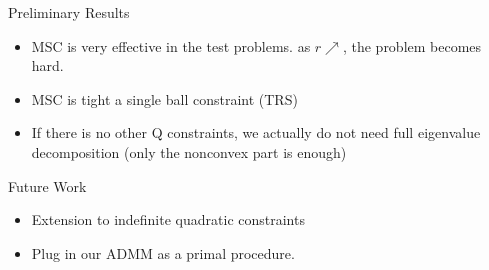 \documentclass[aspectratio=1610, 10pt]{beamer}
\begin{document}
\begin{frame}[allowframebreaks]{Preliminary Results}
  \begin{itemize}
    \item MSC is very effective in the test problems. as \(r \nearrow \), the problem becomes hard.
    \item MSC is tight a single ball constraint (TRS)
    \item If there is no other Q constraints, we actually do not need full eigenvalue decomposition (only the nonconvex part is enough)
  \end{itemize}
\end{frame}



\begin{frame}[allowframebreaks]{Future Work}
  \begin{itemize}
    \item Extension to indefinite quadratic constraints
    \item Plug in our ADMM as a primal procedure.
  \end{itemize}
\end{frame}
\end{document}
